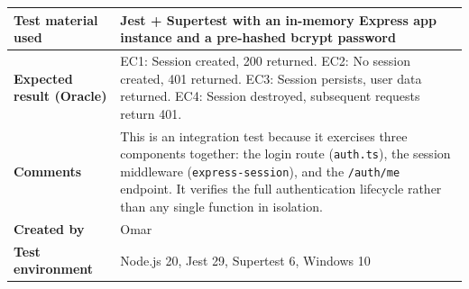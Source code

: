 \begin{table}[h!]
\begin{tabular}{|p{}|p{}|}
\textbf{Test material used} & Jest + Supertest with an in-memory Express app instance and a pre-hashed bcrypt password \\ \hline
\textbf{Expected result (Oracle)} & EC1: Session created, 200 returned. \newline EC2: No session created, 401 returned. \newline EC3: Session persists, user data returned. \newline EC4: Session destroyed, subsequent requests return 401. \\ \hline
\textbf{Comments} & This is an integration test because it exercises three components together: the login route (\texttt{auth.ts}), the session middleware (\texttt{express-session}), and the \texttt{/auth/me} endpoint. It verifies the full authentication lifecycle rather than any single function in isolation. \\ \hline
\textbf{Created by} & Omar \\ \hline
\textbf{Test environment} & Node.js 20, Jest 29, Supertest 6, Windows 10 \\ \hline
\end{tabular}
\end{table}







